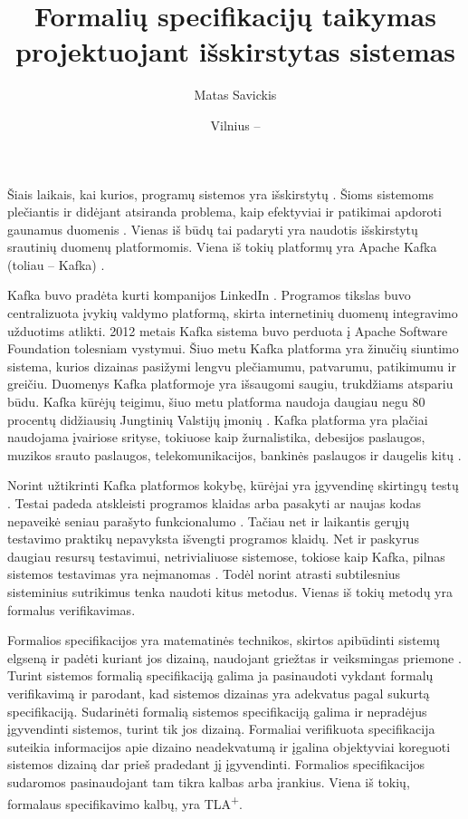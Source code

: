 \documentclass{VUMIFPSmagistrinis}
\title{Formalių specifikacijų taikymas projektuojant išskirstytas sistemas}
\author{Matas Savickis}
\date{Vilnius – \the\year}
\begin{document}
\maketitle

\tableofcontents


		Šiais laikais, kai kurios, programų sistemos yra išskirstytų \cite{mcr}.
		Šioms sistemoms plečiantis ir didėjant atsiranda problema, kaip efektyviai ir patikimai apdoroti gaunamus duomenis \cite{bucchiarone2018monolithic}.
		Vienas iš būdų tai padaryti yra naudotis išskirstytų srautinių duomenų platformomis.
		Viena iš tokių platformų yra Apache Kafka (toliau -- Kafka) \cite{kfk}.


 		Kafka buvo pradėta kurti kompanijos LinkedIn \cite{kfk}. Programos tikslas buvo centralizuota įvykių valdymo platformą, skirta internetinių duomenų integravimo užduotims atlikti.
		2012 metais Kafka sistema buvo perduota į Apache Software Foundation tolesniam vystymui.
		Šiuo metu Kafka platforma yra žinučių siuntimo sistema, kurios dizainas pasižymi lengvu plečiamumu, patvarumu, patikimumu ir greičiu.
		Duomenys Kafka platformoje yra išsaugomi saugiu, trukdžiams atspariu būdu.
		Kafka kūrėjų teigimu, šiuo metu platforma naudoja daugiau negu 80 procentų didžiausių Jungtinių Valstijų įmonių \cite{kfk}.
		Kafka platforma yra plačiai naudojama įvairiose srityse, tokiuose kaip žurnalistika, debesijos paslaugos, muzikos srauto paslaugos, telekomunikacijos, bankinės paslaugos ir daugelis kitų \cite{kfk}.


		Norint užtikrinti Kafka platformos kokybę, kūrėjai yra įgyvendinę skirtingų testų \cite{kfkGH}.
		Testai padeda atskleisti programos klaidas arba pasakyti ar naujas kodas nepaveikė seniau parašyto funkcionalumo \cite{819971}.
		Tačiau net ir laikantis gerųjų testavimo praktikų nepavyksta išvengti programos klaidų.
		Net ir paskyrus daugiau resursų testavimui, netrivialiuose sistemose, tokiose kaip Kafka, pilnas sistemos testavimas yra neįmanomas \cite{sullivan2004software}.
		Todėl norint atrasti subtilesnius sisteminius sutrikimus tenka naudoti kitus metodus.
		Vienas iš tokių metodų yra formalus verifikavimas.


		Formalios specifikacijos yra matematinės technikos, skirtos apibūdinti sistemų elgseną ir padėti kuriant jos dizainą, naudojant griežtas ir veiksmingas priemone \cite{holzmann1995improvement}.
		Turint sistemos formalią specifikaciją galima ja pasinaudoti vykdant formalų verifikavimą ir parodant, kad sistemos dizainas yra adekvatus pagal sukurtą specifikaciją.
		Sudarinėti formalią sistemos specifikaciją galima ir nepradėjus įgyvendinti sistemos, turint tik jos dizainą. 
		Formaliai verifikuota specifikacija suteikia informacijos apie dizaino neadekvatumą ir įgalina objektyviai koreguoti sistemos dizainą dar prieš pradedant jį įgyvendinti.
		Formalios specifikacijos sudaromos pasinaudojant tam tikra kalbas arba įrankius.
		Viena iš tokių, formalaus specifikavimo kalbų, yra TLA\textsuperscript{+}.
		
\end{document}
